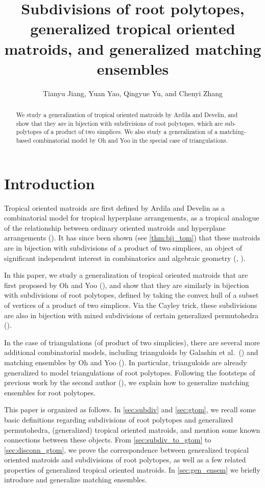 \documentclass[letterpaper,reqno,11pt]{amsart}
\title[Root polytopes, generalized tropical oriented matroids and matching ensembles]{Subdivisions of root polytopes, generalized tropical oriented matroids, and generalized matching ensembles}
\author{Tianyu Jiang, Yuan Yao, Qingyue Yu, and Chenyi Zhang}
\begin{document}
\begin{abstract}
    We study a generalization of tropical oriented matroids by Ardila and Develin, and show that they are in bijection with subdivisions of root polytopes, which are sub-polytopes of a product of two simplices. We also study a generalization of a matching-based combinatorial model by Oh and Yoo in the special case of triangulations.
\end{abstract}

\maketitle

\section{Introduction}

Tropical oriented matroids are first defined by Ardila and Develin as a combinatorial model for tropical hyperplane arrangements, as a tropical analogue of the relationship between ordinary oriented matroids and hyperplane arrangements (\cite{ardila2007tropical}). It has since been shown (see \cref{thm:bij_tom}) that these matroids are in bijection with subdivisions of a product of two simplices, an object of significant independent interest in combinatorics and algebraic geometry (\cite{GKZ1994discriminants}, \cite{postnikov2009permutohedra}).

In this paper, we study a generalization of tropical oriented matroids that are first proposed by Oh and Yoo (\cite{oh2011triangulations}), and show that they are similarly in bijection with subdivisions of root polytopes, defined by taking the convex hull of a subset of vertices of a product of two simplices. Via the Cayley trick, these subdivisions are also in bijection with mixed subdivisions of certain generalized permutohedra (\cite{postnikov2009permutohedra}).

In the case of triangulations (of product of two simplicies), there are several more additional combinatorial models, including trianguloids by Galashin et al.\ (\cite{galashin2018trianguloids}) and matching ensembles by Oh and Yoo (\cite{oh2013ensembles}). In particular, trianguloids are already generalized to model triangulations of root polytopes. Following the footsteps of previous work by the second author (\cite{yao2025linkage}), we explain how to generalize matching ensembles for root polytopes.

This paper is organized as follows. In \cref{sec:subdiv} and \cref{sec:gtom}, we recall some basic definitions regarding subdivisions of root polytopes and generalized permutohedra, (generalized) tropical oriented matroids, and mention some known connections between these objects. From \cref{sec:subdiv_to_gtom} to \cref{sec:disconn_gtom}, we prove the correspondence between generalized tropical oriented matroids and subdivisions of root polytopes, as well as a few related properties of generalized tropical oriented matroids. In \cref{sec:gen_ensem} we briefly introduce and generalize matching ensembles.
\end{document}
